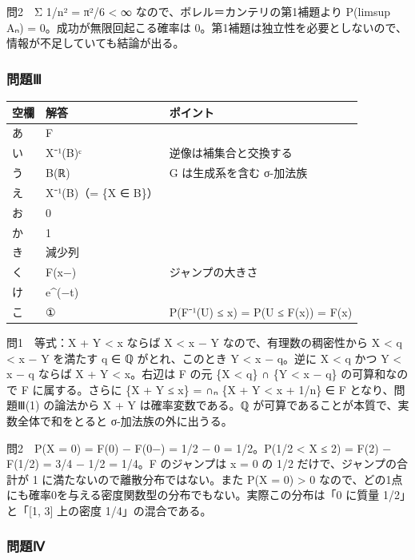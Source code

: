 \documentclass[
  10pt,
  a4paper,
]{article}
\begin{document}
問2　Σ 1/n² = π²/6 \textless{} ∞ なので、ボレル＝カンテリの第1補題より
P(limsup A{\fallbackfont ₙ}) = 0。成功が無限回起こる確率は
0。第1補題は独立性を必要としないので、情報が不足していても結論が出る。

\hypertarget{ux554fux984cux2172}{%
\subsubsection{問題Ⅲ}\label{ux554fux984cux2172}}

\begin{longtable}[]{@{}lll@{}}
\toprule\noalign{}
空欄 & 解答 & ポイント \\
\midrule\noalign{}
\endhead
\bottomrule\noalign{}
\endlastfoot
あ & F & \\
い & X{\fallbackfont ⁻}¹(B){\fallbackfont ᶜ} & 逆像は補集合と交換する \\
う & B({\fallbackfont ℝ}) & G は生成系を含む σ-加法族 \\
え & X{\fallbackfont ⁻}¹(B)（= \{X ∈ B\}） & \\
お & 0 & \\
か & 1 & \\
き & 減少列 & \\
く & F(x−) & ジャンプの大きさ \\
け & e\^{}(−t) & \\
こ & ① & P(F{\fallbackfont ⁻}¹(U) ≤ x) = P(U ≤ F(x)) = F(x) \\
\end{longtable}

問1　等式：X + Y \textless{} x ならば X \textless{} x − Y
なので、有理数の稠密性から X \textless{} q \textless{} x − Y を満たす q
∈ {\fallbackfont ℚ} がとれ、このとき Y \textless{} x − q。逆に X
\textless{} q かつ Y \textless{} x − q ならば X + Y \textless{}
x。右辺は F の元 \{X \textless{} q\} ∩ \{Y \textless{} x − q\}
の可算和なので F に属する。さらに \{X + Y ≤ x\} = ∩{\fallbackfont ₙ} \{X
+ Y \textless{} x + 1/n\} ∈ F となり、問題Ⅲ(1) の論法から X + Y
は確率変数である。{\fallbackfont ℚ}
が可算であることが本質で、実数全体で和をとると σ-加法族の外に出うる。

問2　P(X = 0) = F(0) − F(0−) = 1/2 − 0 = 1/2。P(1/2 \textless{} X ≤ 2) =
F(2) − F(1/2) = 3/4 − 1/2 = 1/4。F のジャンプは x = 0 の 1/2
だけで、ジャンプの合計が 1 に満たないので離散分布ではない。また P(X = 0)
\textgreater{} 0
なので、どの1点にも確率0を与える密度関数型の分布でもない。実際この分布は「0
に質量 1/2」と「{[}1, 3{]} 上の密度 1/4」の混合である。

\hypertarget{ux554fux984cux2173}{%
\subsubsection{問題Ⅳ}\label{ux554fux984cux2173}}
\end{document}
